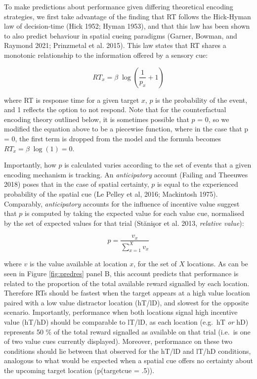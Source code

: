 \documentclass[11pt,halfline,a4paper,]{ouparticle}
\begin{document}
To make predictions about performance given differing theoretical encoding strategies, we first take advantage of the finding that RT follows the Hick-Hyman law of decision-time (Hick 1952; Hyman 1953), and that this law has been shown to also predict behaviour in spatial cueing paradigms (Garner, Bowman, and Raymond 2021; Prinzmetal et al. 2015). This law states that RT shares a monotonic relationship to the information offered by a sensory cue:

\begin{equation}\label{eq:HH}
  RT_x = \beta \; \log(\frac{1}{p_x} + 1)
\end{equation}

where RT is response time for a given target \(x\), \(p\) is the probability of the event, and 1 reflects the option to not respond. Note that for the counterfactual encoding theory outlined below, it is sometimes possible that \(p\) = 0, so we modified the equation above to be a piecewise function, where in the case that p = 0, the first term is dropped from the model and the formula becomes \(RT_x = \beta \; \log(1) = 0\).

Importantly, how \(p\) is calculated varies according to the set of events that a given encoding mechanism is tracking. An \emph{anticipatory} account (Failing and Theeuwes 2018) poses that in the case of spatial certainty, \(p\) is equal to the experienced probability of the spatial cue (Le Pelley et al, 2016; Mackintosh 1975). Comparably, \emph{anticipatory} accounts for the influence of incentive value suggest that \(p\) is computed by taking the expected value for each value cue, normalised by the set of expected values for that trial (Stănişor et al. 2013, \emph{relative value}):

\begin{equation}\label{eq:relVal}
  p = \frac{v_x}{\sum_{x=1}^{X} v_x}
\end{equation}

where \(v\) is the value available at location \(x\), for the set of \(X\) locations. As can be seen in Figure \ref{fig:predres} panel B, this account predicts that performance is related to the proportion of the total available reward signalled by each location. Therefore RTs should be fastest when the target appears at a high value location paired with a low value distractor location (hT/lD), and slowest for the opposite scenario. Importantly, performance when both locations signal high incentive value (hT/hD) should be comparable to lT/lD, as each location (e.g.~hT \emph{or} hD) represents 50 \% of the total reward signalled as available on that trial (i.e.~is one of two value cues currently displayed). Moreover, performance on these two conditions should lie between that observed for the hT/lD and lT/hD conditions, analogous to what would be expected when a spatial cue offers no certainty about the upcoming target location (p(target\textbar cue = .5)).
\end{document}
